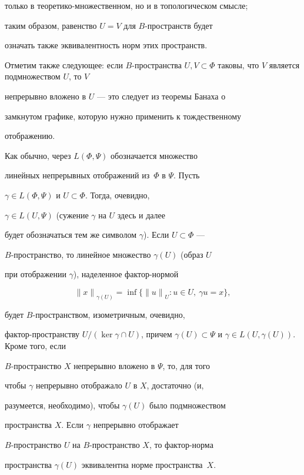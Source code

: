 только в теоретико-мно\-жест\-вен\-ном, но и в топологическом смысле;


таким образом, равенство $U=V$ для $B$-прост\-ранств будет


означать также эквивалентность норм этих пространств.


Отметим также следующее: если $B$-пространства $U, V \subset


\Phi$ таковы, что $V$ является подмножеством $U$, то $V$


непрерывно вложено в $U$ --- это следует из теоремы Банаха о


замкнутом графике, которую нужно применить к тождественному


отображению.





Как обычно, через $L(\Phi, \Psi)$ обозначается множество


линейных непрерывных отображений из~$\Phi$ в $\Psi$. Пусть


$\gamma \in L(\Phi, \Psi)$ и $U \subset \Phi$. Тогда, очевидно,


$\gamma \in L(U, \Psi)$ (сужение $\gamma$ на $U$ здесь и далее


будет обозначаться тем же символом $\gamma$). Если $U \subset \Phi$ ---


$B$-пространство, то линейное множество $\gamma(U)$ (образ $U$


при отображении $\gamma$), наделенное фактор-нормой


$$


{\|x\|}_{\gamma(U)}=\inf \{ {\|u\|}_U : u \in U,\ \gamma u=x \},


$$


будет $B$-пространством, изометричным, очевидно,


фактор-пространству $U/(\ker \gamma \cap U)$, причем $\gamma(U) \subset


\Psi$ и $\gamma \in L(U, \gamma(U))$. Кроме того, если


$B$-пространство $X$ непрерывно вложено в $\Psi$, то, для того


чтобы $\gamma$ непрерывно отображало $U$ в $X$, достаточно (и,


разумеется, необходимо), чтобы $\gamma(U)$ было подмножеством


пространства $X$. Если $\gamma$ непрерывно отображает


$B$-пространство $U$ на $B$-пространство $X$, то фактор-норма


пространства $\gamma (U)$ эквивалентна норме пространства~$X$.





